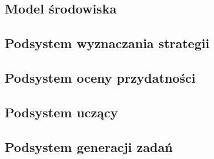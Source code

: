 \subsection{Model środowiska}
\subsection{Podsystem wyznaczania strategii}
\subsection{Podsystem oceny przydatności}
\subsection{Podsystem uczący}
\subsection{Podsystem generacji zadań}
